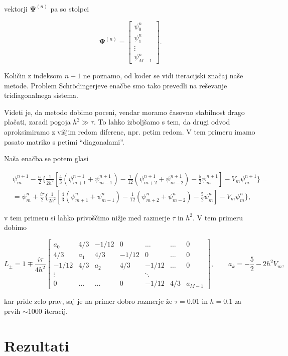 \documentclass[a4 paper, 12pt]{article}
\begin{document}
vektorji $\mathbf{\Psi}^{(n)}$ pa so stolpci

\begin{equation}
	\mathbf{\Psi}^{(n)} = \begin{bmatrix} \psi_0^n \\ \psi_1^n \\ \vdots \\ \psi_{M-1}^n
		\end{bmatrix}.
\end{equation}

Količin z indeksom $n+1$ ne poznamo, od koder se vidi iteracijski značaj naše metode. Problem
Schr\" odingerjeve enačbe smo tako prevedli na reševanje tridiagonalnega sistema.

Videti je, da metodo dobimo poceni, vendar moramo časovno stabilnost drago plačati, zaradi
pogoja $h^2 \gg \tau$. To lahko izboljšamo s tem, da drugi odvod aproksimiramo z višjim redom
diferenc, npr. petim redom. V tem primeru imamo pasato matriko s petimi "`diagonalami"'.

Naša enačba se potem glasi

\begin{align*}
	&\psi_m^{n+1} - \frac{i\tau}{2}\bigg\{\frac{1}{2h^2}\left[\frac{4}{3}\left(
		\psi_{m+1}^{n+1} + \psi_{m-1}^{n+1}\right) - \frac{1}{12}\left(
		\psi_{m+2}^{n+1} + \psi_{m-2}^{n+1}\right) - \frac{5}{2}\psi_m^{n+1}\right] 
		- V_m\psi_m^{n+1}\bigg\} = \\
	&= \psi_m^n + \frac{i\tau}{2}\bigg\{\frac{1}{2h^2}\left[\frac{4}{3}\left(
		\psi_{m+1}^n + \psi_{m-1}^n\right) - \frac{1}{12}\left(
		\psi_{m+2}^n + \psi_{m-2}^n\right) - \frac{5}{2}\psi_m^n\right] -
		V_m\psi_m^n\bigg\},
\end{align*}

v tem primeru si lahko privoščimo nižje med razmerje $\tau$ in $h^2$. V tem primeru
dobimo

\begin{equation}
	L_\pm = 1 \mp \frac{i\tau}{4h^2}\begin{bmatrix}
		a_0 & 4/3 & -1/12 & 0 & \ldots & \ldots & 0 \\
		4/3 & a_1 & 4/3 & -1/12 & 0 & \ldots & 0 \\
		-1/12 & 4/3 & a_2 & 4/3 & -1/12 & \ldots & 0 \\
		\vdots & & & & \ddots & \\
		0 & \ldots & \ldots & 0 & -1/12 & 4/3 & a_{M-1} \end{bmatrix}, \qquad
	a_k = -\frac{5}{2} - 2h^2V_m,
\end{equation}

kar pride zelo prav, saj je na primer dobro razmerje že $\tau = 0.01$ in $h = 0.1$ za prvih
$\sim 1000$ iteracij.

\section{Rezultati}
\end{document}
